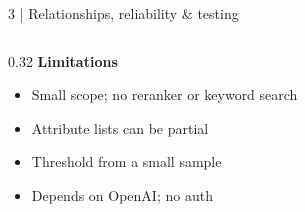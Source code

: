 \documentclass[aspectratio=169,10pt]{beamer}
\begin{document}
\begin{frame}{3 \;|\; Relationships, reliability \& testing}
\begin{columns}[T]
\begin{column}{0.32\textwidth}
\vspace{1mm}
\small\textbf{\color{warn}Limitations}
\scriptsize
\begin{itemize}
  \item Small scope; no reranker or keyword search
  \item Attribute lists can be partial
  \item Threshold from a small sample
  \item Depends on OpenAI; no auth
\end{itemize}
\end{column}
\end{columns}
\end{frame}
\end{document}

